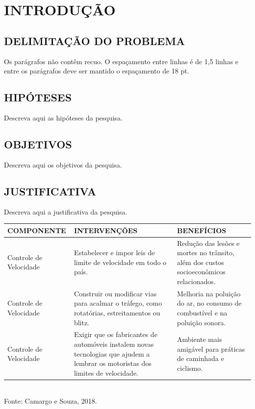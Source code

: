 \chapter{INTRODUÇÃO} \label{introducao}

\section{DELIMITAÇÃO DO PROBLEMA}

Os parágrafos não contêm recuo. O espaçamento entre linhas é de 1,5 linhas e entre os parágrafos deve ser mantido o espaçamento de 18 pt.

\section{HIPÓTESES}

Descreva aqui as hipóteses da pesquisa.

\section{OBJETIVOS}

Descreva aqui os objetivos da pesquisa.

\section{JUSTIFICATIVA}

Descreva aqui a justificativa da pesquisa.

\begin{quadro}[htbp]
\caption{Componentes relacionados à segurança viária, intervenções e benefícios}
\label{quad:componentes}
\centering
\small
\begin{tabular}{|p{3.5cm}|p{5cm}|p{5cm}|}
\hline
\textbf{COMPONENTE} & \textbf{INTERVENÇÕES} & \textbf{BENEFÍCIOS} \\
\hline
Controle de Velocidade & Estabelecer e impor leis de limite de velocidade em todo o país. & Redução das lesões e mortes no trânsito, além dos custos socioeconômicos relacionados. \\
\hline
Controle de Velocidade & Construir ou modificar vias para acalmar o tráfego, como rotatórias, estreitamentos ou blitz. & Melhoria na poluição do ar, no consumo de combustível e na poluição sonora. \\
\hline
Controle de Velocidade & Exigir que os fabricantes de automóveis instalem novas tecnologias que ajudem a lembrar os motoristas dos limites de velocidade. & Ambiente mais amigável para práticas de caminhada e ciclismo. \\
\hline
\end{tabular}
\\[0.2cm]
{\small Fonte: Camargo e Souza, 2018.}
\end{quadro}

